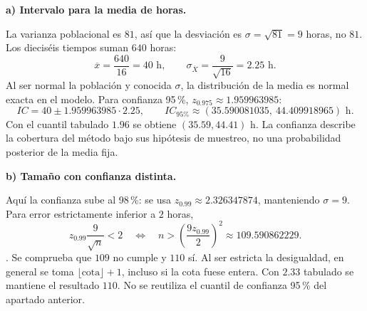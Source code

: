 \textbf{a) Intervalo para la media de horas.}\par\nopagebreak[4]
La varianza poblacional es $81$, así que la desviación es $\sigma=\sqrt{81}=9$ horas, no $81$. Los dieciséis tiempos suman $640$ horas:
\[
\overline x=\frac{640}{16}=40\text{ h},\qquad
\sigma_{\overline X}=\frac9{\sqrt{16}}=2.25\text{ h}.
\]
Al ser normal la población y conocida $\sigma$, la distribución de la media es normal exacta en el modelo. Para confianza 95\,\%, $z_{0.975}\approx1.959963985$:
\[
IC=40\pm1.959963985\cdot2.25,
\qquad\boxed{IC_{\text{95\%}}\approx(35.590081035,\ 44.409918965)\text{ h}.}
\]
Con el cuantil tabulado $1.96$ se obtiene $(35.59,44.41)$ h. La confianza describe la cobertura del método bajo sus hipótesis de muestreo, no una probabilidad posterior de la media fija.

\textbf{b) Tamaño con confianza distinta.}\par\nopagebreak[4]
Aquí la confianza sube al 98\,\%: se usa $z_{0.99}\approx2.326347874$, manteniendo $\sigma=9$. Para error estrictamente inferior a $2$ horas,
\[
z_{0.99}\frac9{\sqrt n}<2
\quad\Longleftrightarrow\quad
n>\left(\frac{9z_{0.99}}2\right)^2\approx109.590862229.
\]
. Se comprueba que $109$ no cumple y $110$ sí. Al ser estricta la desigualdad, en general se toma $\lfloor\text{cota}\rfloor+1$, incluso si la cota fuese entera. Con $2.33$ tabulado se mantiene el resultado $110$. No se reutiliza el cuantil de confianza 95\,\% del apartado anterior.

